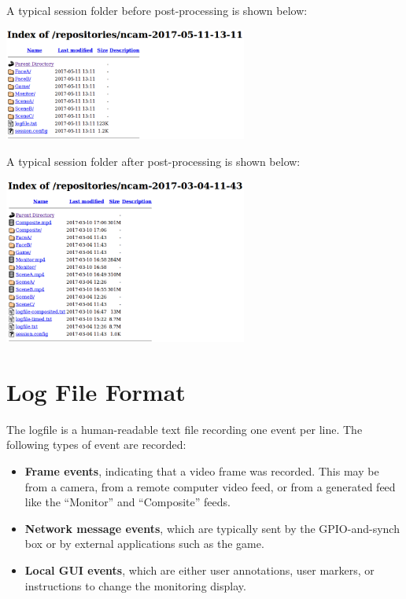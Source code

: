\clearpage
A typical session folder before post-processing is shown below:
\begin{center}
\includegraphics[width=0.6\textwidth]{pics-gui/gui-repo-unprocessed.png}
\end{center}

A typical session folder after post-processing is shown below:
\begin{center}
\includegraphics[width=0.6\textwidth]{pics-gui/gui-repo-afterprocess.png}
\end{center}

\clearpage
\section{Log File Format}

The logfile is a human-readable text file recording one event per line. The 
following types of event are recorded:
\begin{itemize}
\item \textbf{Frame events}, indicating that a video frame was recorded.
This may be from a camera, from a remote computer video feed, or from a
generated feed like the ``Monitor'' and ``Composite'' feeds.
\item \textbf{Network message events}, which are typically sent by the
GPIO-and-synch box or by external applications such as the game.
\item \textbf{Local GUI events}, which are either user annotations, user
markers, or instructions to change the monitoring display.
\end{itemize}


